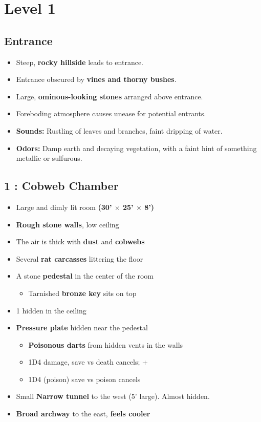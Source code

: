 \section{Level 1}\label{l1}
\subsection{Entrance}\label{l1:out}

\begin{itemize}
  \item Steep, \textbf{rocky hillside} leads to entrance.
  \item Entrance obscured by\textbf{ vines and thorny bushes}.
  \item Large, \textbf{ominous-looking stones} arranged above entrance.
  \item Foreboding atmosphere causes unease for potential entrants.
  \item \textbf{Sounds:} Rustling of leaves and branches, faint dripping of water.
  \item \textbf{Odors:} Damp earth and decaying vegetation, with a faint hint of something metallic or sulfurous.
\end{itemize}


\subsection{1 : Cobweb Chamber}\label{l1:r1}
\begin{itemize}
  \item Large and dimly lit room \textbf{(30' $\times$ 25' $\times$ 8')}
  \item \textbf{Rough stone walls}, low ceiling
  \item The air is thick with \textbf{dust} and \textbf{cobwebs}
  \item Several \textbf{rat carcasses} littering the floor
  \item A stone \textbf{pedestal} in the center of the room 
  \begin{itemize}
    \item Tarnished \textbf{bronze key} sits on top
  \end{itemize}
  \item 1 \textbf{} hidden in the ceiling
  \item \textbf{Pressure plate} hidden near the pedestal
  \begin{itemize}
    \item \textbf{Poisonous darts} from hidden vents in the walls 
      \item 1D4 damage, save vs death cancels; +
      \item 1D4 (poison) save vs poison cancels
  \end{itemize}
  \item Small \textbf{Narrow tunnel} to the west (5' large).
  Almost hidden.
  \item \textbf{Broad archway} to the east, \textbf{feels cooler}
\end{itemize}

